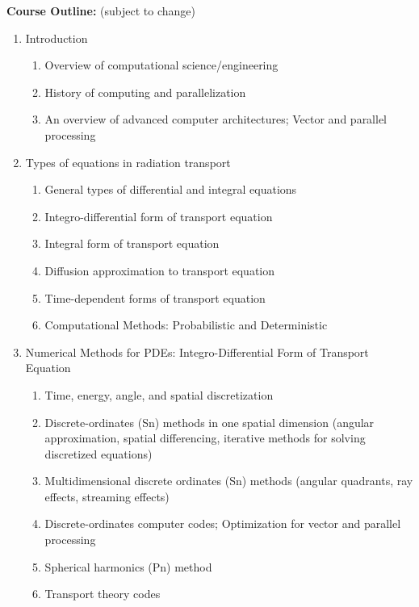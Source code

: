 \documentclass[12pt]{article}
\begin{document}
\vspace*{.15in}
\noindent \textbf{Course Outline:} (subject to change)
\begin{enumerate}
\item Introduction
  \begin{enumerate}
  \item Overview of computational science/engineering 
  \item History of computing and parallelization
  \item An overview of advanced computer architectures; Vector and parallel processing
  \end{enumerate}

\item Types of equations in radiation transport
  \begin{enumerate}
  \item General types of differential and integral equations
  \item Integro-differential form of transport equation 
  \item Integral form of transport equation 
  \item Diffusion approximation to transport equation
  \item Time-dependent forms of transport equation
  \item Computational Methods: Probabilistic and Deterministic
  \end{enumerate}

\item Numerical Methods for PDEs: Integro-Differential Form of Transport Equation
  \begin{enumerate}
  \item Time, energy, angle, and spatial discretization
  \item Discrete-ordinates (Sn) methods in one spatial dimension (angular approximation, spatial differencing, iterative methods for solving discretized equations)
  \item Multidimensional discrete ordinates (Sn) methods (angular quadrants, ray effects, streaming effects)
  \item Discrete-ordinates computer codes; Optimization for vector and parallel processing
  \item Spherical harmonics (Pn) method
  \item Transport theory codes
  \end{enumerate}


\end{enumerate}
\end{document}
